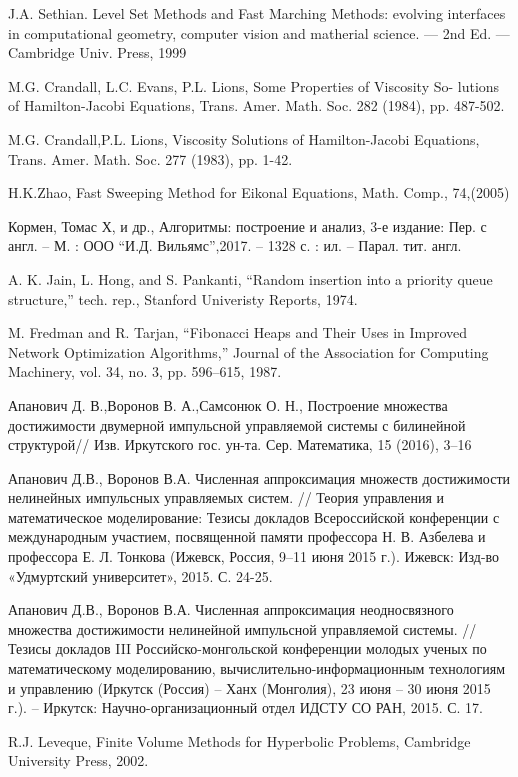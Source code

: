 \pagebreak
\begin{thebibliography}{99}

 {J.A. Sethian.} Level Set Methods and Fast Marching Methods: evolving
  interfaces in computational geometry, computer vision and matherial
  science. — 2nd Ed. — Cambridge Univ. Press, 1999

 {M.G. Crandall, L.C. Evans, P.L. Lions}, Some
  Properties of Viscosity So- lutions of Hamilton-Jacobi Equations,
  Trans. Amer. Math. Soc. 282 (1984), pp. 487-502.

 {M.G. Crandall,P.L. Lions}, Viscosity Solutions of
  Hamilton-Jacobi Equations, Trans. Amer. Math. Soc. 277 (1983),
  pp. 1-42.

 {H.K.Zhao}, Fast Sweeping Method for Eikonal Equations, Math. Comp.,
74,(2005)

 {Кормен, Томас Х, и др.}, Алгоритмы: построение и
  анализ, 3-е издание: Пер. с англ. -- М. : ООО
  ``И.Д. Вильямс'',2017. -- 1328 с. : ил. -- Парал. тит. англ.

 {A. K. Jain, L. Hong, and S. Pankanti}, “Random insertion into a priority queue
structure,” tech. rep., Stanford Univeristy Reports, 1974.


 {M. Fredman and R. Tarjan}, “Fibonacci Heaps and Their Uses in Improved
Network Optimization Algorithms,” Journal of the Association for Computing
Machinery, vol. 34, no. 3, pp. 596–615, 1987.

  
 {Апанович Д. В.,Воронов В. А.,Самсонюк О. Н.},
  Построение множества достижимости двумерной импульсной управляемой
  системы с билинейной структурой// Изв. Иркутского
  гос. ун-та. Сер. Математика, 15 (2016), 3–16

 Апанович Д.В., Воронов В.А. Численная аппроксимация
  множеств достижимости нелинейных импульсных управляемых систем. //
  Теория управления и математическое моделирование: Тезисы докладов
  Всероссийской конференции с международным участием, посвященной
  памяти профессора Н. В. Азбелева и профессора Е. Л. Тонкова (Ижевск,
  Россия, 9–11 июня 2015 г.). Ижевск: Изд-во «Удмуртский университет»,
  2015. С. 24-25.

 Апанович Д.В., Воронов В.А. Численная аппроксимация
  неодносвязного множества достижимости нелинейной импульсной
  управляемой системы. //  Тезисы докладов III Российско-монгольской
  конференции молодых ученых по математическому моделированию,
  вычислительно-информационным технологиям и управлению (Иркутск
  (Россия) – Ханх (Монголия), 23 июня – 30 июня 2015 г.). – Иркутск:
  Научно-организационный отдел ИДСТУ СО РАН, 2015. С. 17.



 {R.J. Leveque}, Finite Volume Methods for Hyperbolic Problems, Cambridge
University Press, 2002.


  
\end{thebibliography}



